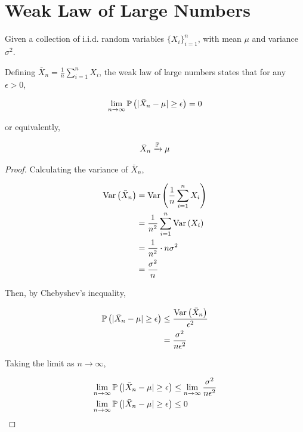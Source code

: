 \section{Weak Law of Large Numbers}

Given a collection of i.i.d. random variables $\{X_i\}_{i=1}^n$, with mean $\mu$ and variance $\sigma^2$.

Defining $\bar{X}_n = \frac{1}{n} \sum_{i=1}^n X_i$, the weak law of large numbers states that for any $\epsilon > 0$,

\begin{align*}
\lim_{n \to \infty} \mathbb{P}\left(|\bar{X}_n - \mu| \geq \epsilon\right) = 0
\end{align*}

or equivalently,

\begin{align*}
\bar{X}_n \xrightarrow{\mathbb{P}} \mu
\end{align*}

\begin{proof}
Calculating the variance of $\bar{X}_n$,

\begin{align*}
\text{Var}\left(\bar{X}_n\right) &= \text{Var}\left(\frac{1}{n} \sum_{i=1}^n X_i\right) \\
&= \frac{1}{n^2} \sum_{i=1}^n \text{Var}\left(X_i\right) \\
&= \frac{1}{n^2} \cdot n \sigma^2 \\
&= \frac{\sigma^2}{n}
\end{align*}

Then, by Chebyshev's inequality,

\begin{align*}
\mathbb{P}\left(|\bar{X}_n - \mu| \geq \epsilon\right) &\leq \frac{\text{Var}\left(\bar{X}_n\right)}{\epsilon^2} \\
&= \frac{\sigma^2}{n \epsilon^2}
\end{align*}

Taking the limit as $n \to \infty$,

\begin{align*}
\lim_{n \to \infty} \mathbb{P}\left(|\bar{X}_n - \mu| \geq \epsilon\right) &\leq \lim_{n \to \infty} \frac{\sigma^2}{n \epsilon^2} \\
\lim_{n \to \infty} \mathbb{P}\left(|\bar{X}_n - \mu| \geq \epsilon\right) &\leq 0
\end{align*}

\end{proof}
